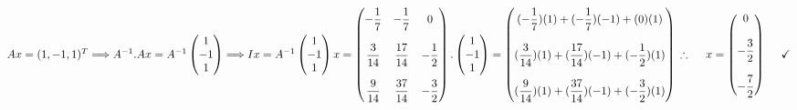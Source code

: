 \documentclass[fleqn]{article}
\begin{document}
\begin{enumerate}
\begin{itemize}
          \textcolor{hwColor}{
            $
              \\
              Ax=(1, -1, 1)^T
              \Longrightarrow
              A^{-1}.Ax=A^{-1}\begin{pmatrix}
                1
                \\
                -1
                \\
                1
              \end{pmatrix}
              \Longrightarrow
              Ix=A^{-1}\begin{pmatrix}
                1
                \\
                -1
                \\
                1
              \end{pmatrix}
              \\
              \\
              \\
              x=\begin{pmatrix}
                -\dfrac{1}{7} & -\dfrac{1}{7} & 0
                \\
                \\
                \dfrac{3}{14} & \dfrac{17}{14} & -\dfrac{1}{2}
                \\
                \\
                \dfrac{9}{14} & \dfrac{37}{14} & -\dfrac{3}{2}
              \end{pmatrix}.\begin{pmatrix}
                1
                \\
                -1
                \\
                1
              \end{pmatrix}
              =\begin{pmatrix}
                (-\dfrac{1}{7})(1)+(-\dfrac{1}{7})(-1)+(0)(1)
                \\
                \\
                (\dfrac{3}{14})(1)+(\dfrac{17}{14})(-1)+(-\dfrac{1}{2})(1)
                \\
                \\
                (\dfrac{9}{14})(1)+(\dfrac{37}{14})(-1)+(-\dfrac{3}{2})(1)
              \end{pmatrix}
              \\
              \\
              \\
              \\
              \therefore ~~~~ x=\begin{pmatrix}
                0
                \\
                \\
                -\dfrac{3}{2}
                \\
                \\
                -\dfrac{7}{2}
              \end{pmatrix} ~~~~ \checkmark
            $
          }
      \end{itemize}


\end{enumerate}
\end{document}
